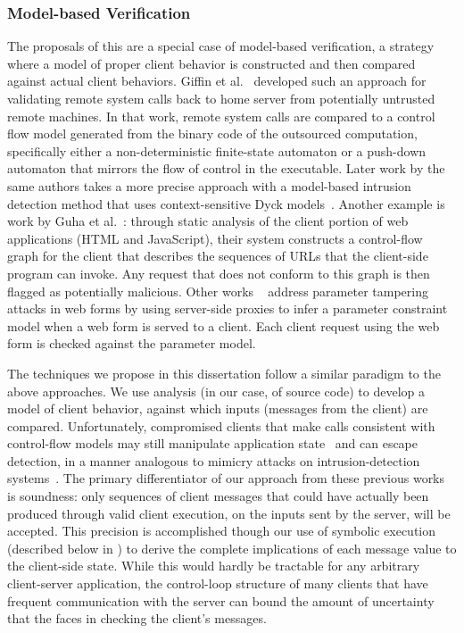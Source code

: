 \subsubsection{Model-based Verification}
The proposals of this \dissertation are a special case of model-based
verification, a strategy where a model of proper client behavior is
constructed and then compared against actual client behaviors. Giffin
et al.~\cite{giffin02:remote} developed such an approach for
validating remote system calls back to home server from potentially
untrusted remote machines. In that work, remote system calls are
compared to a control flow model generated from the binary code of the
outsourced computation, specifically either a non-deterministic
finite-state automaton or a push-down automaton that mirrors the flow
of control in the executable. Later work by the same authors takes a
more precise approach with a model-based intrusion detection method
that uses context-sensitive Dyck models~\cite{giffin04:context}.
Another example is work by Guha et al.~\cite{guha09:ajax}: through
static analysis of the client portion of web applications (HTML and
JavaScript), their system constructs a control-flow graph for the
client that describes the sequences of URLs that the client-side
program can invoke.  Any request that does not conform to this graph
is then flagged as potentially malicious. Other works
~\cite{bisht10:notamper,skrupsky13:tamperproof} address parameter
tampering attacks in web forms by using server-side proxies to infer a
parameter constraint model when a web form is served to a client. Each
client request using the web form is checked against the parameter
model. 

The techniques we propose in this dissertation follow a similar
paradigm to the above approaches. We use analysis (in our case, of
source code) to develop a model of client behavior, against which
inputs (messages from the client) are compared.  Unfortunately,
compromised clients that make calls consistent with control-flow models
may still manipulate application state~\cite{chen05:noncontrol} and
can escape detection, in a manner analogous to mimicry attacks on
intrusion-detection systems~\cite{wagner02:mimicry,tan03:hiding}. The
primary differentiator of our approach from these previous works is
soundness: only sequences of client messages that could have actually
been produced through valid client execution, on the inputs sent by
the server, will be accepted. This precision is accomplished though
our use of symbolic execution (described below in
) to derive the complete implications of
each message value to the client-side state. While this would hardly
be tractable for any arbitrary client-server application, the
control-loop structure of many clients that have frequent communication
with the server can bound the amount of uncertainty that the \verifier
faces in checking the client's messages.

